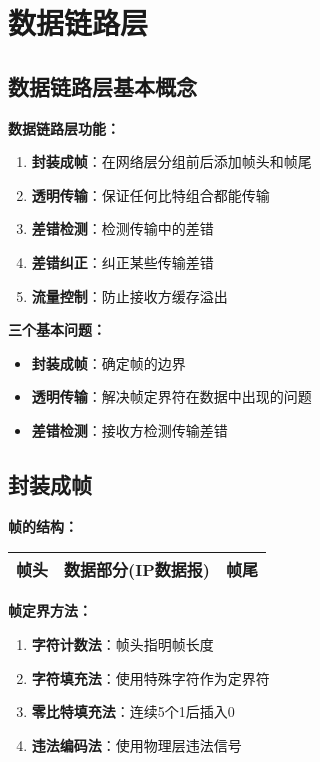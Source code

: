 \documentclass[lang=cn,newtx,10pt,scheme=chinese]{../../elegantbook}
\begin{document}
\chapter{数据链路层}

\section{数据链路层基本概念}

\textbf{数据链路层功能：}
\begin{enumerate}
  \item \textbf{封装成帧}：在网络层分组前后添加帧头和帧尾
  \item \textbf{透明传输}：保证任何比特组合都能传输
  \item \textbf{差错检测}：检测传输中的差错
  \item \textbf{差错纠正}：纠正某些传输差错
  \item \textbf{流量控制}：防止接收方缓存溢出
\end{enumerate}

\textbf{三个基本问题：}
\begin{itemize}
  \item \textbf{封装成帧}：确定帧的边界
  \item \textbf{透明传输}：解决帧定界符在数据中出现的问题
  \item \textbf{差错检测}：接收方检测传输差错
\end{itemize}

\section{封装成帧}

\textbf{帧的结构：}
\begin{center}
\begin{tabular}{|c|c|c|}
\hline
帧头 & 数据部分(IP数据报) & 帧尾 \\
\hline
\end{tabular}
\end{center}

\textbf{帧定界方法：}
\begin{enumerate}
  \item \textbf{字符计数法}：帧头指明帧长度
  \item \textbf{字符填充法}：使用特殊字符作为定界符
  \item \textbf{零比特填充法}：连续5个1后插入0
  \item \textbf{违法编码法}：使用物理层违法信号
\end{enumerate}
\end{document}
